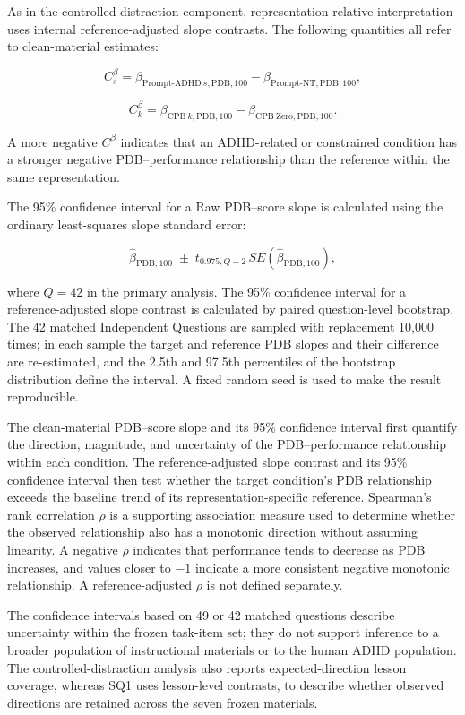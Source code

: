 As in the controlled-distraction component, representation-relative interpretation uses internal reference-adjusted slope contrasts. The following quantities all refer to clean-material estimates:

\[
C^{\beta}_{s}
=
\beta_{\mathrm{Prompt}\text{-}\mathrm{ADHD}\ s,\mathrm{PDB},100}
-
\beta_{\mathrm{Prompt}\text{-}\mathrm{NT},\mathrm{PDB},100},
\]

\[
C^{\beta}_{k}
=
\beta_{\mathrm{CPB}\ k,\mathrm{PDB},100}
-
\beta_{\mathrm{CPB\ Zero},\mathrm{PDB},100}.
\]

A more negative $C^\beta$ indicates that an ADHD-related or constrained condition has a stronger negative PDB--performance relationship than the reference within the same representation.

The 95\% confidence interval for a Raw PDB--score slope is calculated using the ordinary least-squares slope standard error:

\[
\hat\beta_{\mathrm{PDB},100}
\;\pm\;
t_{0.975,Q-2}\,
SE\!\left(\hat\beta_{\mathrm{PDB},100}\right),
\]

where $Q=42$ in the primary analysis. The 95\% confidence interval for a reference-adjusted slope contrast is calculated by paired question-level bootstrap. The 42 matched Independent Questions are sampled with replacement 10,000 times; in each sample the target and reference PDB slopes and their difference are re-estimated, and the 2.5th and 97.5th percentiles of the bootstrap distribution define the interval. A fixed random seed is used to make the result reproducible.

The clean-material PDB--score slope and its 95\% confidence interval first quantify the direction, magnitude, and uncertainty of the PDB--performance relationship within each condition. The reference-adjusted slope contrast and its 95\% confidence interval then test whether the target condition's PDB relationship exceeds the baseline trend of its representation-specific reference. Spearman's rank correlation $\rho$ is a supporting association measure used to determine whether the observed relationship also has a monotonic direction without assuming linearity. A negative $\rho$ indicates that performance tends to decrease as PDB increases, and values closer to $-1$ indicate a more consistent negative monotonic relationship. A reference-adjusted $\rho$ is not defined separately.

The confidence intervals based on 49 or 42 matched questions describe uncertainty within the frozen task-item set; they do not support inference to a broader population of instructional materials or to the human ADHD population. The controlled-distraction analysis also reports expected-direction lesson coverage, whereas SQ1 uses lesson-level contrasts, to describe whether observed directions are retained across the seven frozen materials.

